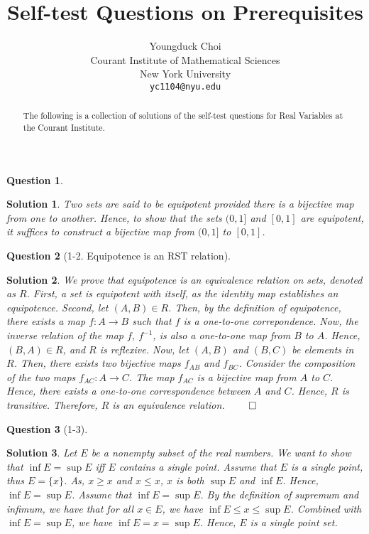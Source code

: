 \documentclass{article} %
\title{Self-test Questions on Prerequisites}
\author{
Youngduck Choi \\
Courant Institute of Mathematical Sciences \\
New York University \\
\texttt{yc1104@nyu.edu} \\
}
\theoremstyle{quest}
\newtheorem*{question}{Question}
\newtheorem*{solution}{Solution}
\begin{document}
\maketitle

\begin{abstract}
The following is a collection of solutions of the self-test questions for Real
Variables at the Courant Institute.
\end{abstract}

\begin{question}
\end{question}
\begin{solution}
Two sets are said to be equipotent provided there is a bijective map from one to another.
Hence, to show that the sets $(0,1]$ and $[0,1]$ are equipotent, it suffices to construct
a bijective map from $(0,1]$ to $[0,1]$. 
\end{solution}

\bigskip

\begin{question}[1-2. Equipotence is an RST relation]
\end{question}
\begin{solution}
We prove that equipotence is an equivalence relation on sets, denoted as $R$.
First, a set is equipotent with
itself, as the identity map establishes an equipotence. Second, let $(A,B) \in R$. Then,
by the definition of equipotence, there exists a map $f:A \to B$ such that $f$ is a one-to-one
correpondence. Now, the inverse relation of the map $f$, $f^{-1}$, is also a one-to-one map from
$B$ to $A$. Hence, $(B,A) \in R$, and $R$ is reflexive. Now, let $(A,B)$ and $(B,C)$ be elements
in $R$. Then, there exists two bijective maps $f_{AB}$ and $f_{BC}$. Consider the composition of
the two maps $f_{AC}:A \to C$. The map $f_{AC}$ is a bijective map from $A$ to $C$. Hence,
there exists a one-to-one correspondence between $A$ and $C$. Hence, $R$ is transitive. Therefore,
$R$ is an equivalence relation. $\qed$
\end{solution}

\begin{question}[1-3]
\end{question}
\begin{solution}
Let $E$ be a nonempty subset of the real numbers. We want to show that $\inf E = \sup E$ iff $E$ contains
a single point. Assume that $E$ is a single point, thus $E = \{ x \}$. As, $x \geq x$ and $x \leq x$, $x$
is both $\sup E$ and $\inf E$. Hence, $\inf E = \sup E$. Assume that $\inf E = \sup E$. By the definition of
supremum and infimum, we have that for all $x \in E$, we have $\inf E \leq x \leq \sup E$. Combined with $\inf E
= \sup E$, we have $\inf E = x = \sup E$. Hence, $E$ is a single point set.
\end{solution}
\end{document}

